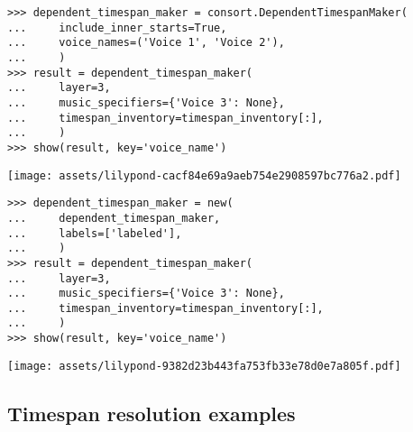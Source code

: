 \begin{singlespacing}
\vspace{-0.5\baselineskip}
\begin{lstlisting}
>>> dependent_timespan_maker = consort.DependentTimespanMaker(
...     include_inner_starts=True,
...     voice_names=('Voice 1', 'Voice 2'),
...     )
>>> result = dependent_timespan_maker(
...     layer=3,
...     music_specifiers={'Voice 3': None},
...     timespan_inventory=timespan_inventory[:],
...     )
>>> show(result, key='voice_name')
\end{lstlisting}
\noindent\texttt{[image: assets/lilypond-cacf84e69a9aeb754e2908597bc776a2.pdf]}
\end{singlespacing}

\begin{comment}
<abjad>
dependent_timespan_maker = new(
    dependent_timespan_maker,
    labels=['labeled'],
    )
result = dependent_timespan_maker(
    layer=3,
    music_specifiers={'Voice 3': None},
    timespan_inventory=timespan_inventory[:],
    )
show(result, key='voice_name')
</abjad>
\end{comment}

\begin{singlespacing}
\vspace{-0.5\baselineskip}
\begin{lstlisting}
>>> dependent_timespan_maker = new(
...     dependent_timespan_maker,
...     labels=['labeled'],
...     )
>>> result = dependent_timespan_maker(
...     layer=3,
...     music_specifiers={'Voice 3': None},
...     timespan_inventory=timespan_inventory[:],
...     )
>>> show(result, key='voice_name')
\end{lstlisting}
\noindent\texttt{[image: assets/lilypond-9382d23b443fa753fb33e78d0e7a805f.pdf]}
\end{singlespacing}

\subsection{Timespan resolution examples}

\begin{comment}
<abjad>
layer_1_timespan_maker = consort.FloodedTimespanMaker()
layer_1_target_timespan = timespantools.Timespan(0, (19, 4))
layer_1_music_specifiers = collections.OrderedDict([
    ('Voice 2', None),
    ('Voice 3', None),
    ])
layer_1 = layer_1_timespan_maker(
    layer=1,
    music_specifiers=layer_1_music_specifiers,
    target_timespan=layer_1_target_timespan,
    )
show(layer_1, key='voice_name', range_=(0, (21, 4)))
</abjad>
\end{comment}

